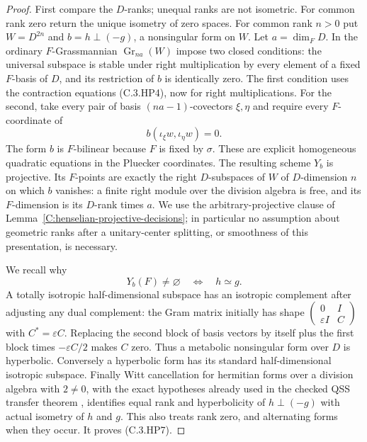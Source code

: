 \begin{proof}
First compare the $D$-ranks; unequal ranks are not isometric.
For common rank zero return the unique isometry of zero spaces.
For common rank $n>0$ put $W=D^{2n}$ and
$b=h\perp(-g)$, a nonsingular form on $W$.
Let $a=\dim_FD$. In the ordinary $F$-Grassmannian
$\operatorname{Gr}_{na}(W)$ impose two closed conditions:
the universal subspace is stable under right multiplication
by every element of a fixed $F$-basis of $D$, and its
restriction of $b$ is identically zero.
The first condition uses the contraction equations
(C.3.HP4), now for right multiplications.
For the second, take every pair of basis
$(na-1)$-covectors $\xi,\eta$ and require every $F$-coordinate
of
\[
                     b(\iota_\xi w,\iota_\eta w)=0.   \tag{C.3.HP6}
\]
The form $b$ is $F$-bilinear because $F$ is fixed by $\sigma$.
These are explicit homogeneous quadratic equations in the
Pluecker coordinates. The resulting scheme $Y_b$ is projective.
Its $F$-points are exactly the right $D$-subspaces of $W$
of $D$-dimension $n$ on which $b$ vanishes: a finite
right module over the division algebra is free, and its
$F$-dimension is its $D$-rank times $a$.
We use the arbitrary-projective clause of
Lemma~\ref{C:henselian-projective-decisions}; in particular no
assumption about geometric ranks after a unitary-center
splitting, or smoothness of this presentation, is necessary.

We recall why
\[
       Y_b(F)\ne\varnothing
         \quad\Longleftrightarrow\quad h\simeq g.     \tag{C.3.HP7}
\]
A totally isotropic half-dimensional subspace has an
isotropic complement after adjusting any dual complement:
the Gram matrix initially has shape
$\left(\begin{smallmatrix}0&I\\\varepsilon I&C\end{smallmatrix}\right)$
with $C^*=\varepsilon C$. Replacing the second block of
basis vectors by itself plus the first block times
$-\varepsilon C/2$ makes $C$ zero.
Thus a metabolic nonsingular form over $D$ is hyperbolic.
Conversely a hyperbolic form has its standard half-dimensional
isotropic subspace.
Finally Witt cancellation for hermitian forms over a division
algebra with $2\ne0$, with the exact hypotheses already used
in the checked QSS transfer theorem
\cite[Section 3, pp.\ 271--273]{C-QSS1979}, identifies equal
rank and hyperbolicity of $h\perp(-g)$ with actual isometry
of $h$ and $g$.
This also treats rank zero, and alternating forms when they
occur. It proves (C.3.HP7).


\end{proof}
